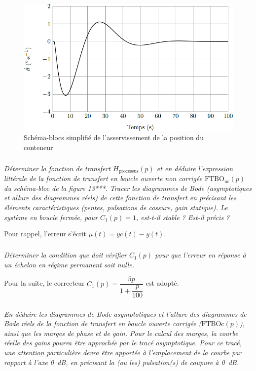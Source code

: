 \documentclass[10pt,fleqn]{article} %
\begin{document}
\begin{figure}[H]
\centering
\includegraphics[width=\linewidth]{images/fig_13}
\caption{Schéma-blocs simplifié de l’asservissement de la position du conteneur \label{fig_13}}
\end{figure}



\subparagraph{\label{q18}}\textit{Déterminer la fonction de transfert 
$H_{\text{processus}}(p)$ et en déduire l’expression littérale de la fonction de
transfert en boucle ouverte non corrigée $\text{FTBO}_{\text{nc}}(p)$ du schéma-bloc de la figure 13***. Tracer les diagrammes de
Bode (asymptotiques et allure des diagrammes réels) de cette fonction de transfert en précisant les éléments
caractéristiques (pentes, pulsations de cassure, gain statique). Le système en boucle fermée, pour $C_1(p) = 1$,
est-t-il stable ? Est-il précis ?}

Pour rappel, l’erreur s’écrit $\mu(t) = yc(t) - y(t)$.

\subparagraph{\label{q19}}\textit{Déterminer la condition que doit vérifier $C_1(p)$ pour que l’erreur en réponse à un échelon en régime permanent soit nulle.}

Pour la suite, le correcteur $C_1(p)=\dfrac{5p}{1+\dfrac{p}{100}}$ est adopté. 

\subparagraph{\label{q20}}\textit{En déduire les diagrammes de Bode asymptotiques et l’allure des diagrammes de Bode réels de la
fonction de transfert en boucle ouverte corrigée ($\text{FTBOc}(p)$), ainsi que les marges de phase et de gain. Pour
le calcul des marges, la courbe réelle des gains pourra être approchée par le tracé asymptotique. Pour ce
tracé, une attention particulière devra être apportée à l’emplacement de la courbe par rapport à l’axe \SI{0}{dB}, en
précisant la (ou les) pulsation(s) de coupure à \SI{0}{dB}.}
\end{document}
